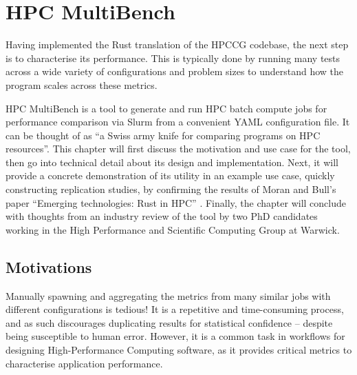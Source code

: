 \chapter{HPC MultiBench}
\label{ch:hpc-multibench} %

Having implemented the Rust translation of the HPCCG codebase, the next step is to characterise its performance. This is typically done by running many tests across a wide variety of configurations and problem sizes to understand how the program scales across these metrics.

HPC MultiBench is a tool to generate and run HPC batch compute jobs for performance comparison via Slurm from a convenient YAML configuration file. It can be thought of as ``a Swiss army knife for comparing programs on HPC resources''. This chapter will first discuss the motivation and use case for the tool, then go into technical detail about its design and implementation. Next, it will provide a concrete demonstration of its utility in an example use case, quickly constructing replication studies, by confirming the results of Moran and Bull's paper ``Emerging technologies: Rust in HPC'' \cite{moranEmergingTechnologiesRust2023}. Finally, the chapter will conclude with thoughts from an industry review of the tool by two PhD candidates working in the High Performance and Scientific Computing Group at Warwick.

\section{Motivations}
\label{sec:hpc-multibench-motivation} %

Manually spawning and aggregating the metrics from many similar jobs with different configurations is tedious! It is a repetitive and time-consuming process, and as such discourages duplicating results for statistical confidence -- despite being susceptible to human error. However, it is a common task in workflows for designing High-Performance Computing software, as it provides critical metrics to characterise application performance.

